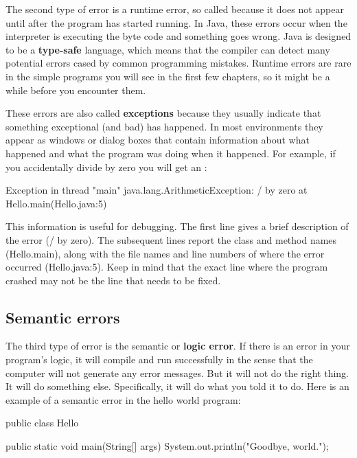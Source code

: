 The second type of error is a runtime error, so called because it does not appear until after the program has started running.
In Java, these errors occur when the interpreter is executing the byte code and something goes wrong.
Java is designed to be a {\bf type-safe} language, which means that the compiler can detect many potential errors cased by common programming mistakes.
Runtime errors are rare in the simple programs you will see in the first few chapters, so it might be a while before you encounter them.


These errors are also called {\bf exceptions} because they usually indicate that something exceptional (and bad) has happened.
In most environments they appear as windows or dialog boxes that contain information about what happened and what the program was doing when it happened.
For example, if you accidentally divide by zero you will get an :

\begin{small}
\begin{stdout}
Exception in thread "main" java.lang.ArithmeticException: / by zero
    at Hello.main(Hello.java:5)
\end{stdout}
\end{small}

This information is useful for debugging.
The first line gives a brief description of the error (/ by zero).
The subsequent lines report the class and method names (Hello.main), along with the file names and line numbers of where the error occurred (Hello.java:5).
Keep in mind that the exact line where the program crashed may not be the line that needs to be fixed.

\subsection{Semantic errors}


The third type of error is the semantic or {\bf logic error}.
If there is an error in your program's logic, it will compile and run successfully in the sense that the computer will not generate any error messages.
But it will not do the right thing.
It will do something else.
Specifically, it will do what you told it to do.
Here is an example of a semantic error in the hello world program:

\begin{code}
public class Hello {

    public static void main(String[] args) {
        System.out.println("Goodbye, world.");
    }

}
\end{code}

